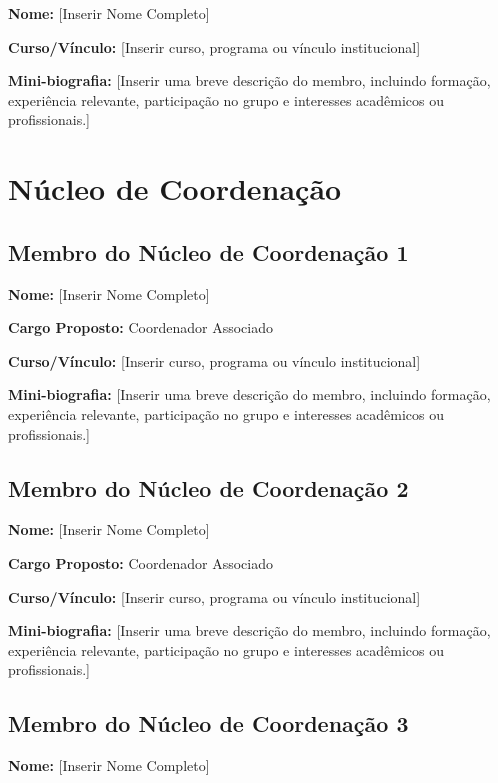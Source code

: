 \documentclass[11pt,a4paper]{article}
\begin{document}
\textbf{Nome:} [Inserir Nome Completo]

\textbf{Curso/Vínculo:} [Inserir curso, programa ou vínculo institucional]

\textbf{Mini-biografia:}  
[Inserir uma breve descrição do membro, incluindo formação, experiência relevante, participação no grupo e interesses acadêmicos ou profissionais.]

\section{Núcleo de Coordenação}

\subsection{Membro do Núcleo de Coordenação 1}

\textbf{Nome:} [Inserir Nome Completo]

\textbf{Cargo Proposto:} Coordenador Associado

\textbf{Curso/Vínculo:} [Inserir curso, programa ou vínculo institucional]

\textbf{Mini-biografia:}  
[Inserir uma breve descrição do membro, incluindo formação, experiência relevante, participação no grupo e interesses acadêmicos ou profissionais.]

\vspace{1em}

\subsection{Membro do Núcleo de Coordenação 2}

\textbf{Nome:} [Inserir Nome Completo]

\textbf{Cargo Proposto:} Coordenador Associado

\textbf{Curso/Vínculo:} [Inserir curso, programa ou vínculo institucional]

\textbf{Mini-biografia:}  
[Inserir uma breve descrição do membro, incluindo formação, experiência relevante, participação no grupo e interesses acadêmicos ou profissionais.]

\vspace{1em}

\subsection{Membro do Núcleo de Coordenação 3}

\textbf{Nome:} [Inserir Nome Completo]
\end{document}
